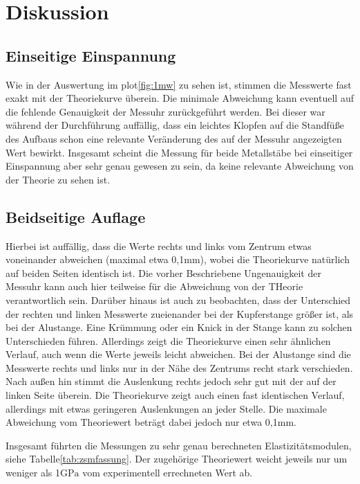 \section{Diskussion}
\label{sec:Diskussion}

\subsection{Einseitige Einspannung}

Wie in der Auswertung im plot\ref{fig:1mw} zu sehen ist, stimmen die Messwerte fast exakt mit der Theoriekurve überein.
Die minimale Abweichung kann eventuell auf die fehlende Genauigkeit der Messuhr zurückgeführt werden. Bei dieser
war während der Durchführung auffällig, dass ein leichtes Klopfen auf die Standfüße des Aufbaus schon eine relevante
Veränderung des auf der Messuhr angezeigten Wert bewirkt. Insgesamt scheint die Messung für beide Metallstäbe
bei einseitiger Einspannung aber sehr genau gewesen zu sein, da keine relevante Abweichung von der Theorie zu sehen ist.

\subsection{Beidseitige Auflage}

Hierbei ist auffällig, dass die Werte rechts und links vom Zentrum etwas voneinander abweichen (maximal etwa 0,1$\si{\milli\meter}$), 
wobei die Theoriekurve 
natürlich auf beiden Seiten identisch ist. Die vorher Beschriebene Ungenauigkeit der Messuhr kann auch hier teilweise für die Abweichung
von der THeorie verantwortlich sein.
Darüber hinaus ist auch zu beobachten, dass der Unterschied der rechten und linken Messwerte zueienander bei der Kupferstange größer ist, als bei der 
Alustange. Eine Krümmung oder ein Knick in der Stange kann zu solchen Unterschieden führen. 
Allerdings zeigt die Theoriekurve einen sehr ähnlichen Verlauf, auch wenn die Werte jeweils leicht abweichen.
Bei der Alustange sind die Messwerte rechts und links nur in der Nähe des Zentrums recht stark verschieden. Nach außen hin 
stimmt die Auslenkung rechts jedoch sehr gut mit der auf der linken Seite überein. Die Theoriekurve zeigt auch einen fast identischen
Verlauf, allerdings mit etwas geringeren Auslenkungen an jeder Stelle. Die maximale Abweichung vom Theoriewert beträgt dabei jedoch 
nur etwa 0,1$\si{\milli\meter}$. 

Insgesamt führten die Messungen zu sehr genau berechneten Elastizitätsmodulen, siehe Tabelle\ref{tab:zsmfassung}. Der zugehörige
Theoriewert weicht jeweils nur um weniger als 1$\si{\giga\pascal}$ vom experimentell errechneten Wert ab.



